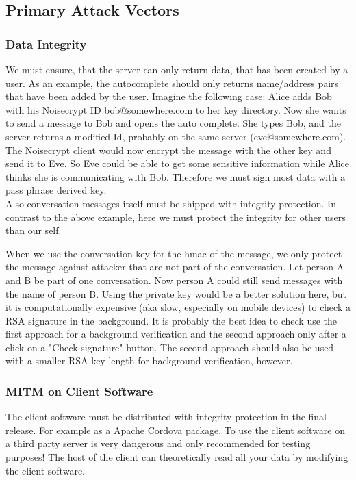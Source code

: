 \documentclass{scrartcl}
\begin{document}
  \subsection{Primary Attack Vectors}
  
  \subsubsection{Data Integrity}
We must ensure, that the server can only return data, that has been created by a user. 
As an example, the autocomplete should only returns name/address pairs that have been added by the user. Imagine the following case: Alice adds Bob with his Noisecrypt ID bob@somewhere.com to her key directory. Now she wants to send a message to Bob and opens the auto complete. She types Bob, and the server returns a modified Id, probably on the same server (eve@somewhere.com). The Noisecrypt client would now encrypt the message with the other key and send it to Eve. So Eve could be able to get some sensitive information while Alice thinks she is communicating with Bob.
Therefore we must sign most data with a pass phrase derived key.\\

  Also conversation messages itself must be shipped with integrity protection. In contrast to the above example, here we must protect the integrity for other users than our self.

When we use the conversation key for the hmac of the message, we only protect the message against attacker that are not part of the conversation. Let person A and B be part of one conversation. Now person A could still send messages with the name of person B. Using the private key would be a better solution here, but it is computationally expensive (aka slow, especially on mobile devices) to check a RSA signature in the background. It is probably the best idea to check use the first approach for a background verification and the second approach only after a click on a "Check signature" button. The second approach should also be used with a smaller RSA key length for background verification, however.


   

  \subsubsection{MITM on Client Software}
  The client software must be distributed with integrity protection in the final release. For example as a Apache Cordova package. To use the client software on a third party server is very dangerous and only recommended for testing purposes! The host of the client can theoretically read all your data by modifying the client software.
  
\end{document}
